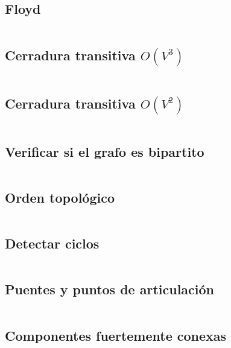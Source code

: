 \documentclass[11pt]{article}
\begin{document}
		\subsection{Floyd}
		\inputminted[tabsize=2,breaklines,firstline=167,lastline=175,fontsize=\small]{c++}{graph.cpp}
		
		\subsection{Cerradura transitiva $O(V^3)$}
		\inputminted[tabsize=2,breaklines,firstline=177,lastline=184,fontsize=\small]{c++}{graph.cpp}
		
		\subsection{Cerradura transitiva $O(V^2)$}
		\inputminted[tabsize=2,breaklines,firstline=186,lastline=200,fontsize=\small]{c++}{graph.cpp}
		
		\subsection{Verificar si el grafo es bipartito}
		\inputminted[tabsize=2,breaklines,firstline=202,lastline=224,fontsize=\small]{c++}{graph.cpp}
		
		\subsection{Orden topológico}
		\inputminted[tabsize=2,breaklines,firstline=226,lastline=252,fontsize=\small]{c++}{graph.cpp}

		\subsection{Detectar ciclos}
		\inputminted[tabsize=2,breaklines,firstline=254,lastline=274,fontsize=\small]{c++}{graph.cpp}
		
		\subsection{Puentes y puntos de articulación}
		\inputminted[tabsize=2,breaklines,firstline=276,lastline=304,fontsize=\small]{c++}{graph.cpp}
		
		\subsection{Componentes fuertemente conexas}
		\inputminted[tabsize=2,breaklines,firstline=306,lastline=335,fontsize=\small]{c++}{graph.cpp}
		
\end{document}
